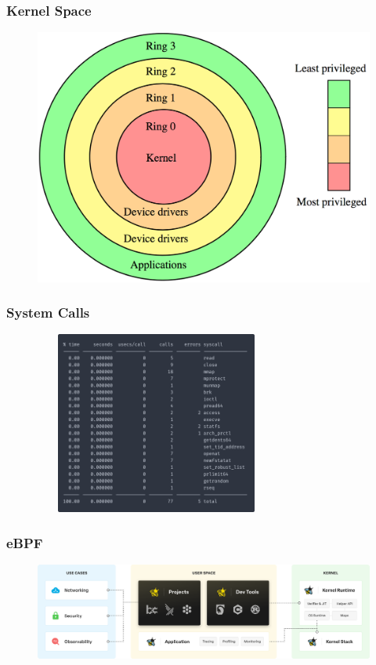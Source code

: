 \documentclass[pdflatex,compress]{beamer}
\begin{document}
\begin{frame}
\frametitle{Kernel Space}
\bigskip
\begin{figure}[t]
\includegraphics[scale=0.15]{kernel.png}
\centering
\end{figure}
\end{frame}

\begin{frame}
\frametitle{System Calls}
\bigskip
\begin{figure}[t]
\includegraphics[width=8cm, height=6cm]{strace2.png}
\centering
\end{figure}
\end{frame}

\begin{frame}
\frametitle{eBPF}

\begin{figure}[x]
\includegraphics[scale=0.25]{bpf.png}
\centering
\end{figure}
\end{frame}
\end{document}
